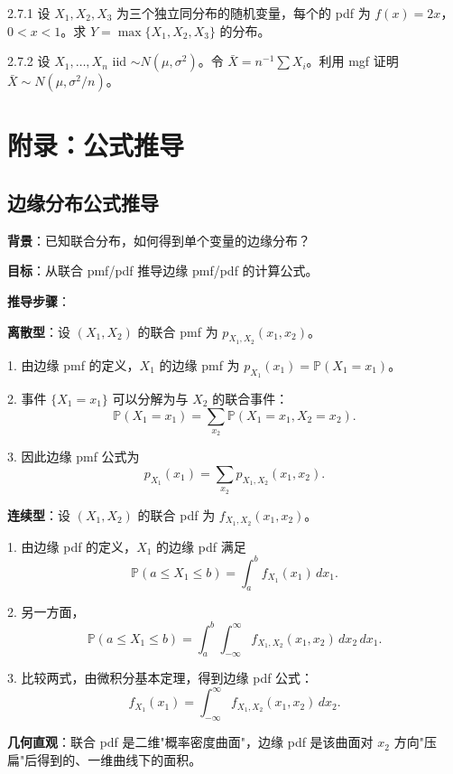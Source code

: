 \begin{exercise}{2.7.1}
设 $X_1, X_2, X_3$ 为三个独立同分布的随机变量，每个的 pdf 为 $f(x) = 2x$，$0 < x < 1$。求 $Y = \max\{X_1, X_2, X_3\}$ 的分布。
\end{exercise}

\begin{exercise}{2.7.2}
设 $X_1, \ldots, X_n$ iid $\sim N(\mu, \sigma^2)$。令 $\bar{X} = n^{-1}\sum X_i$。利用 mgf 证明 $\bar{X} \sim N(\mu, \sigma^2/n)$。
\end{exercise}

\section{附录：公式推导}\label{sec:appendix-ch2}

\subsection{边缘分布公式推导}\label{sec:derivation-ch2-marginal-distributions}

\textbf{背景}：已知联合分布，如何得到单个变量的边缘分布？

\textbf{目标}：从联合 pmf/pdf 推导边缘 pmf/pdf 的计算公式。

\textbf{推导步骤}：

\textbf{离散型}：设 $(X_1, X_2)$ 的联合 pmf 为 $p_{X_1, X_2}(x_1, x_2)$。

1. 由边缘 pmf 的定义，$X_1$ 的边缘 pmf 为 $p_{X_1}(x_1) = \mathbb{P}(X_1 = x_1)$。

2. 事件 $\{X_1 = x_1\}$ 可以分解为与 $X_2$ 的联合事件：
\[
\mathbb{P}(X_1 = x_1) = \sum_{x_2} \mathbb{P}(X_1 = x_1, X_2 = x_2).
\]

3. 因此边缘 pmf 公式为
\[
p_{X_1}(x_1) = \sum_{x_2} p_{X_1, X_2}(x_1, x_2).
\]

\textbf{连续型}：设 $(X_1, X_2)$ 的联合 pdf 为 $f_{X_1, X_2}(x_1, x_2)$。

1. 由边缘 pdf 的定义，$X_1$ 的边缘 pdf 满足
\[
\mathbb{P}(a \leq X_1 \leq b) = \int_a^b f_{X_1}(x_1) \, dx_1.
\]

2. 另一方面，
\[
\mathbb{P}(a \leq X_1 \leq b) = \int_a^b \int_{-\infty}^{\infty} f_{X_1, X_2}(x_1, x_2) \, dx_2 \, dx_1.
\]

3. 比较两式，由微积分基本定理，得到边缘 pdf 公式：
\[
f_{X_1}(x_1) = \int_{-\infty}^{\infty} f_{X_1, X_2}(x_1, x_2) \, dx_2.
\]

\textbf{几何直观}：联合 pdf 是二维"概率密度曲面"，边缘 pdf 是该曲面对 $x_2$ 方向"压扁"后得到的、一维曲线下的面积。

